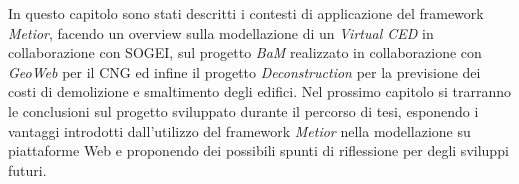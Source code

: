 In questo capitolo sono stati descritti i contesti di applicazione del framework
\emph{Metior}, facendo un overview sulla modellazione di un \emph{Virtual CED} in collaborazione con
SOGEI, sul progetto \emph{BaM} realizzato in collaborazione con \emph{GeoWeb} per il CNG
ed infine il progetto \emph{Deconstruction} per la previsione dei costi di demolizione e smaltimento degli edifici.
Nel prossimo capitolo si trarranno le conclusioni sul progetto sviluppato durante il
percorso di tesi, esponendo i vantaggi introdotti dall’utilizzo del framework
\emph{Metior} nella modellazione su piattaforme Web e proponendo dei possibili
spunti di riflessione per degli sviluppi futuri.
